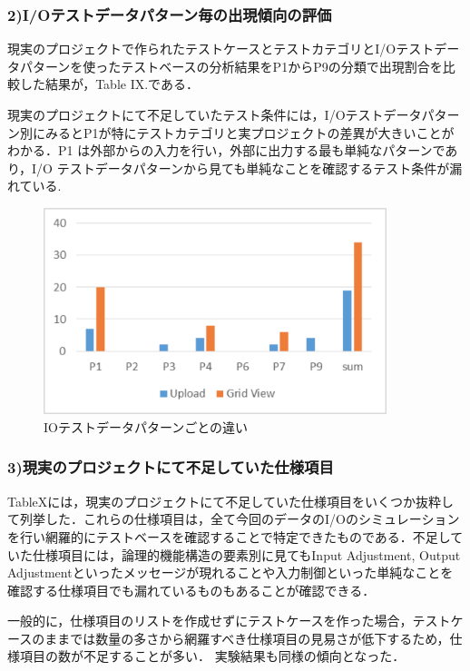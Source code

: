 \subsubsection{2)I/Oテストデータパターン毎の出現傾向の評価}
現実のプロジェクトで作られたテストケースとテストカテゴリとI/Oテストデータパターンを使ったテストベースの分析結果をP1からP9の分類で出現割合を比較した結果が，Table IX.である．

現実のプロジェクトにて不足していたテスト条件には，I/Oテストデータパターン別にみるとP1が特にテストカテゴリと実プロジェクトの差異が大きいことがわかる．P1 は外部からの入力を行い，外部に出力する最も単純なパターンであり，I/O テストデータパターンから見ても単純なことを確認するテスト条件が漏れている.
\begin{figure}[htbp]
\begin{center}
\includegraphics[width=10cm]{./image/D-4-Fig11.png}
\caption{IOテストデータパターンごとの違い}
\label{fig:D-4-Fig11}
\end{center}
\end{figure}

\subsubsection{3)現実のプロジェクトにて不足していた仕様項目}
TableXには，現実のプロジェクトにて不足していた仕様項目をいくつか抜粋して列挙した．これらの仕様項目は，全て今回のデータのI/Oのシミュレーションを行い網羅的にテストベースを確認することで特定できたものである．不足していた仕様項目には，論理的機能構造の要素別に見てもInput Adjustment, Output Adjustmentといったメッセージが現れることや入力制御といった単純なことを確認する仕様項目でも漏れているものもあることが確認できる．

一般的に，仕様項目のリストを作成せずにテストケースを作った場合，テストケースのままでは数量の多さから網羅すべき仕様項目の見易さが低下するため，仕様項目の数が不足することが多い．
実験結果も同様の傾向となった．

